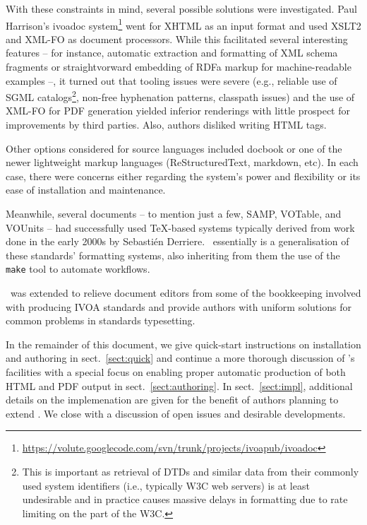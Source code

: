 \documentclass[11pt,a4paper]{ivoa}
\begin{document}
With these constraints in mind, several possible solutions were
investigated.  Paul
Harrison's ivoadoc
system\footnote{\url{https://volute.googlecode.com/svn/trunk/projects/ivoapub/ivoadoc}} 
went for XHTML as
an input format and used XSLT2 and XML-FO as document processors.  While
this facilitated several interesting features  -- for instance,
automatic extraction and formatting of XML schema fragments or
straightvorward embedding of RDFa markup for machine-readable examples
--, it turned out that tooling issues were severe (e.g., reliable use
of SGML catalogs\footnote{This is important as retrieval of DTDs and
similar data from their commonly used system identifiers (i.e.,
typically W3C web servers) is at least undesirable and in practice
causes massive delays in formatting due to rate limiting on the part of
the W3C.}, non-free hyphenation patterns, classpath issues) and the use
of XML-FO for PDF generation yielded inferior renderings with little
prospect for improvements by third parties. Also, authors disliked
writing HTML tags.

Other options considered for source languages included docbook or one of
the newer lightweight markup languages (ReStructuredText, markdown,
etc).  In each case, there were concerns either regarding the system's power
and flexibility or its ease of installation and maintenance.

Meanwhile, several documents -- to mention just a few, SAMP, VOTable,
and VOUnits -- had successfully used \TeX-based systems typically
derived from work done in the early 2000s by Sebasti\'en Derriere.
\ivoatex\ essentially is a generalisation of these standards' formatting
systems, also inheriting from them the use of the \texttt{make} tool to
automate workflows.

\ivoatex\ was extended to relieve document editors from some of the
bookkeeping involved with producing IVOA standards and provide authors
with uniform solutions for common problems in standards typesetting.

In the remainder of this document, we give quick-start instructions
on installation and authoring in sect.~\ref{sect:quick} and continue
a more thorough discussion of \ivoatex's facilities with a special focus
on enabling proper automatic production of both HTML and PDF output in
sect.~\ref{sect:authoring}.  In sect.~\ref{sect:impl}, additional
details on the implemenation are given for the benefit of authors
planning to extend \ivoatex.  We close with a discussion of open issues
and desirable developments.
\end{document}
